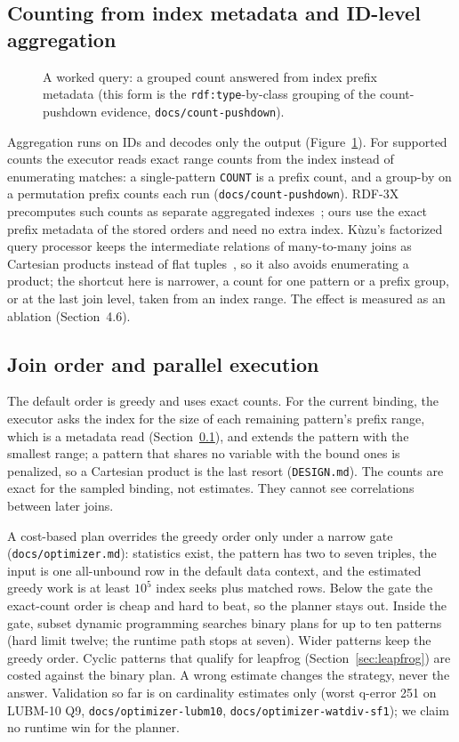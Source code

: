 \documentclass[sigconf, nonacm]{acmart}
\begin{document}
\subsection{Counting from index metadata and ID-level aggregation}\label{sec:counting}
\begin{figure}[t]
\centering
\resizebox{0.8\textwidth}{!}{}
\caption{A worked query: a grouped count answered from index prefix metadata (this form is the \texttt{rdf:type}-by-class grouping of the count-pushdown evidence, \texttt{docs/count-pushdown}).}
\label{fig:worked}
\end{figure}

Aggregation runs on IDs and decodes only the output (Figure~\ref{fig:worked}). For supported counts the executor reads exact range counts from the index instead of enumerating matches:
a single-pattern \texttt{COUNT} is a prefix count, and a group-by on a permutation prefix counts each run (\texttt{docs/count-pushdown}). RDF-3X precomputes such counts as separate aggregated indexes~\cite{neumann2008};
ours use the exact prefix metadata of the stored orders and need no extra index. Kùzu's factorized query processor keeps the intermediate relations of many-to-many joins as Cartesian products instead of flat tuples~\cite{feng2023}, so it also avoids enumerating a product; the shortcut here is narrower, a count for one pattern or a prefix group, or at the last join level, taken from an index range. The effect is measured as an ablation (Section~4.6).

\subsection{Join order and parallel execution}
The default order is greedy and uses exact counts. For the current binding, the executor asks the index for the size of each remaining pattern's prefix range, which is a metadata read (Section~\ref{sec:counting}), and extends the pattern with the smallest range; a pattern that shares no variable with the bound ones is penalized, so a Cartesian product is the last resort (\texttt{DESIGN.md}). The counts are exact for the sampled binding, not estimates. They cannot see correlations between later joins.

A cost-based plan overrides the greedy order only under a narrow gate (\texttt{docs/optimizer.md}): statistics exist, the pattern has two to seven triples, the input is one all-unbound row in the default data context, and the estimated greedy work is at least $10^5$ index seeks plus matched rows. Below the gate the exact-count order is cheap and hard to beat, so the planner stays out. Inside the gate, subset dynamic programming searches binary plans for up to ten patterns (hard limit twelve; the runtime path stops at seven). Wider patterns keep the greedy order. Cyclic patterns that qualify for leapfrog (Section~\ref{sec:leapfrog}) are costed against the binary plan. A wrong estimate changes the strategy, never the answer. Validation so far is on cardinality estimates only (worst q-error 251 on LUBM-10 Q9, \texttt{docs/optimizer-lubm10}, \texttt{docs/optimizer-watdiv-sf1}); we claim no runtime win for the planner.
\end{document}

